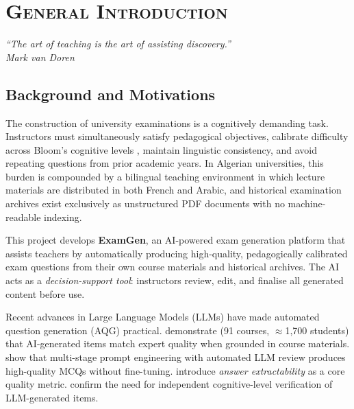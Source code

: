 \newpage
\section*{\textsc{General Introduction}}
\lhead{}
\cfoot{\thepage}
\pagestyle{fancy}
\renewcommand{\headrulewidth}{0.4pt}

\begin{flushright}
\textit{``The art of teaching is the art of assisting discovery.''\\
Mark van Doren}
\end{flushright}

\subsection*{Background and Motivations}

The construction of university examinations is a cognitively demanding task.
Instructors must simultaneously satisfy pedagogical objectives, calibrate difficulty
across Bloom's cognitive levels \cite{bloom2001}, maintain linguistic consistency,
and avoid repeating questions from prior academic years.
In Algerian universities, this burden is compounded by a bilingual teaching environment
in which lecture materials are distributed in both French and Arabic, and historical
examination archives exist exclusively as unstructured PDF documents with no
machine-readable indexing.

This project develops \textbf{ExamGen}, an AI-powered exam generation platform
that assists teachers by automatically producing high-quality, pedagogically
calibrated exam questions from their own course materials and historical archives.
The AI acts as a \textit{decision-support tool}: instructors review, edit, and
finalise all generated content before use.

Recent advances in Large Language Models (LLMs) have made automated question
generation (AQG) practical. \citet{isley2025quality} demonstrate (91 courses,
$\approx$1,700 students) that AI-generated items match expert quality when grounded
in course materials. \citet{mucciaccia2025mcq} show that multi-stage prompt
engineering with automated LLM review produces high-quality MCQs without fine-tuning.
\citet{morris2024aqg} introduce \textit{answer extractability} as a core quality
metric. \citet{meissner2024itemforge} confirm the need for independent cognitive-level
verification of LLM-generated items.

